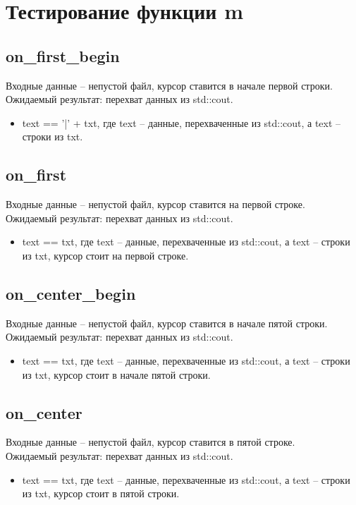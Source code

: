 \documentclass{article}
\begin{document}
\section{Тестирование функции m}
\subsection{on\_first\_begin}
Входные данные -- непустой файл, курсор ставится в начале первой строки.\\
Ожидаемый результат: перехват данных из std::cout.
\begin{itemize}
    \item text == '|' + txt, где text -- данные, перехваченные из std::cout, а text -- строки из txt.
\end{itemize}
\subsection{on\_first}
Входные данные -- непустой файл, курсор ставится на первой строке.\\
Ожидаемый результат: перехват данных из std::cout.
\begin{itemize}
    \item text == txt, где text -- данные, перехваченные из std::cout, а text -- строки из txt, курсор стоит на первой строке.
\end{itemize}
\subsection{on\_center\_begin}
Входные данные -- непустой файл, курсор ставится в начале пятой строки.\\
Ожидаемый результат: перехват данных из std::cout.
\begin{itemize}
    \item text == txt, где text -- данные, перехваченные из std::cout, а text -- строки из txt, курсор стоит в начале пятой строки.
\end{itemize}
\subsection{on\_center}
Входные данные -- непустой файл, курсор ставится в пятой строке.\\
Ожидаемый результат: перехват данных из std::cout.
\begin{itemize}
    \item text == txt, где text -- данные, перехваченные из std::cout, а text -- строки из txt, курсор стоит в пятой строки.
\end{itemize}
\end{document}
